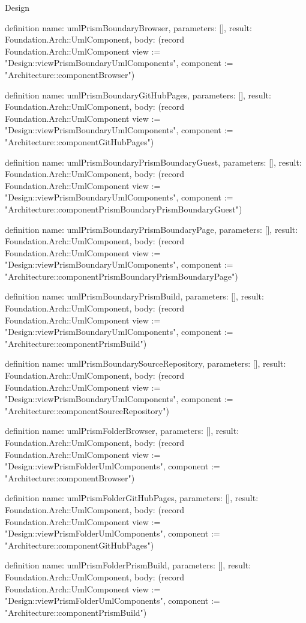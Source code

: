 \begin{lexlean}{Design}
\begin{semanticmodule}
definition{
  name: umlPrismBoundaryBrowser,
  parameters: [],
  result: Foundation.Arch::UmlComponent,
  body: (record Foundation.Arch::UmlComponent {view := "Design::viewPrismBoundaryUmlComponents", component := "Architecture::componentBrowser"})
}

definition{
  name: umlPrismBoundaryGitHubPages,
  parameters: [],
  result: Foundation.Arch::UmlComponent,
  body: (record Foundation.Arch::UmlComponent {view := "Design::viewPrismBoundaryUmlComponents", component := "Architecture::componentGitHubPages"})
}

definition{
  name: umlPrismBoundaryPrismBoundaryGuest,
  parameters: [],
  result: Foundation.Arch::UmlComponent,
  body: (record Foundation.Arch::UmlComponent {view := "Design::viewPrismBoundaryUmlComponents", component := "Architecture::componentPrismBoundaryPrismBoundaryGuest"})
}

definition{
  name: umlPrismBoundaryPrismBoundaryPage,
  parameters: [],
  result: Foundation.Arch::UmlComponent,
  body: (record Foundation.Arch::UmlComponent {view := "Design::viewPrismBoundaryUmlComponents", component := "Architecture::componentPrismBoundaryPrismBoundaryPage"})
}

definition{
  name: umlPrismBoundaryPrismBuild,
  parameters: [],
  result: Foundation.Arch::UmlComponent,
  body: (record Foundation.Arch::UmlComponent {view := "Design::viewPrismBoundaryUmlComponents", component := "Architecture::componentPrismBuild"})
}

definition{
  name: umlPrismBoundarySourceRepository,
  parameters: [],
  result: Foundation.Arch::UmlComponent,
  body: (record Foundation.Arch::UmlComponent {view := "Design::viewPrismBoundaryUmlComponents", component := "Architecture::componentSourceRepository"})
}

definition{
  name: umlPrismFolderBrowser,
  parameters: [],
  result: Foundation.Arch::UmlComponent,
  body: (record Foundation.Arch::UmlComponent {view := "Design::viewPrismFolderUmlComponents", component := "Architecture::componentBrowser"})
}

definition{
  name: umlPrismFolderGitHubPages,
  parameters: [],
  result: Foundation.Arch::UmlComponent,
  body: (record Foundation.Arch::UmlComponent {view := "Design::viewPrismFolderUmlComponents", component := "Architecture::componentGitHubPages"})
}

definition{
  name: umlPrismFolderPrismBuild,
  parameters: [],
  result: Foundation.Arch::UmlComponent,
  body: (record Foundation.Arch::UmlComponent {view := "Design::viewPrismFolderUmlComponents", component := "Architecture::componentPrismBuild"})
}


\end{semanticmodule}
\end{lexlean}
